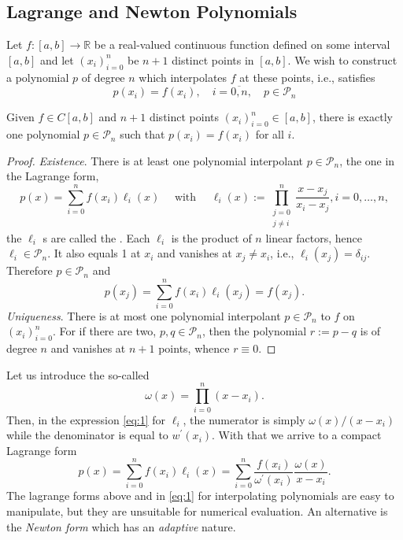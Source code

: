 \documentclass[a4paper]{scrartcl}
\begin{document}
\subsection{Lagrange and Newton Polynomials}

Let $f:[a, b] \rightarrow \mathbb{R}$ be a real-valued continuous function defined on some interval $[a, b]$ and let $\left(x_{i}\right)_{i=0}^{n}$ be $n+1$ distinct points in $[a, b]$. We wish to construct a polynomial $p$ of degree $n$ which interpolates $f$ at these points, i.e., satisfies
$$
p\left(x_{i}\right)=f\left(x_{i}\right), \quad i=\overline{0, n}, \quad p \in \mathcal{P}_{n}
$$

\begin{theorem}
Given $f \in C[a, b]$ and $n+1$ distinct points $\left(x_{i}\right)_{i=0}^{n} \in[a, b]$, there is exactly one polynomial $p \in \mathcal{P}_{n}$ such that $p\left(x_{i}\right)=f\left(x_{i}\right)$ for all $i$.
\end{theorem}
\begin{proof}
  \emph{Existence}. There is at least one polynomial interpolant $p \in \mathcal{P}_{n}$, the one in the Lagrange form,
  \begin{equation}\label{eq:1}
p(x)=\sum_{i=0}^{n} f\left(x_{i}\right) \ell_{i}(x) \quad \text { with } \quad \ell_{i}(x):=\prod_{\substack{j=0\\ j \neq i}}^{n} \frac{x-x_{j}}{x_{i}-x_{j}}, i = 0, \dots, n,\tag{$\dagger$}
  \end{equation}
the $\ell_{i}$ s are called the . Each $\ell_{i}$ is the product of $n$ linear factors, hence $\ell_{i} \in \mathcal{P}_{n}$. It also equals 1 at $x_{i}$ and vanishes at $x_{j} \neq x_{i}$, i.e., $\ell_{i}\left(x_{j}\right)=\delta_{i j}$. Therefore $p \in \mathcal{P}_{n}$ and
$$
p\left(x_{j}\right)=\sum_{i=0}^{n} f\left(x_{i}\right) \ell_{i}\left(x_{j}\right)=f\left(x_{j}\right) .
$$
\emph{Uniqueness}. There is at most one polynomial interpolant $p \in \mathcal{P}_{n}$ to $f$ on $\left(x_{i}\right)_{i=0}^{n}$. For if there are two, $p, q \in \mathcal{P}_{n}$, then the polynomial $r:=p-q$ is of degree $n$ and vanishes at $n+1$ points, whence $r \equiv 0$.
\end{proof}

Let us introduce the so-called 
$$
\omega(x)=\prod_{i=0}^{n}\left(x-x_{i}\right) .
$$
Then, in the expression \eqref{eq:1} for $\ell_{i}$, the numerator is simply $\omega(x) /\left(x-x_{i}\right)$ while the denominator is equal to $w^{\prime}\left(x_{i}\right)$. With that we arrive to a compact Lagrange form
$$
\boxed{
  p(x)=\sum_{i=0}^{n} f\left(x_{i}\right) \ell_{i}(x)=\sum_{i=0}^{n} \frac{f\left(x_{i}\right)}{\omega^{\prime}\left(x_{i}\right)} \frac{\omega(x)}{x-x_{i}}
}.
$$
The lagrange forms above and in \eqref{eq:1} for interpolating polynomials are easy to manipulate, but they are unsuitable for numerical evaluation. An alternative is the \emph{Newton form} which has an \emph{adaptive} nature.
\end{document}
